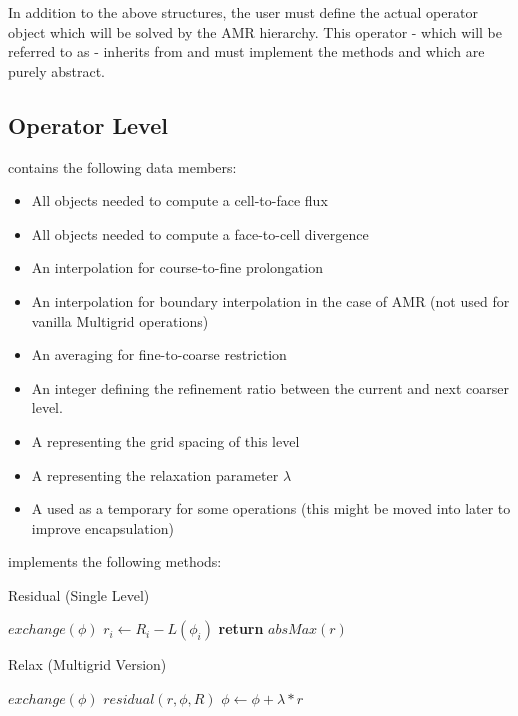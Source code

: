 \documentclass[12pt,a4paper]{article}
\begin{document}
In addition to the above structures, the user must define the actual operator object which will be solved by the AMR hierarchy. This operator - which will be referred to as  - inherits from  and must implement the methods  and  which are purely abstract. 

\subsection{Operator Level}
 contains the following data members:
\begin{itemize}
\item All  objects needed to compute a cell-to-face flux
\item All  objects needed to compute a face-to-cell divergence
\item An interpolation  for course-to-fine prolongation
\item An interpolation  for boundary interpolation in the case of AMR (not used for vanilla Multigrid operations)
\item An averaging  for fine-to-coarse restriction
\item An integer defining the refinement ratio between the current and next coarser level. 
\item A  representing the grid spacing of this level
\item A  representing the relaxation parameter $\lambda$
\item A  used as a temporary for some operations (this might be moved into  later to improve encapsulation)
\end{itemize}

 implements the following methods:

\begin{algorithm}
\caption{Residual (Single Level)}
\begin{algorithmic}[1]
\State $exchange(\phi)$
	\State $r_i \gets R_i - L(\phi_i)$ 
\EndFor
\State \textbf{return} $absMax(r)$
\EndProcedure
\end{algorithmic}
\end{algorithm}


\begin{algorithm}
\caption{Relax (Multigrid Version)}
\begin{algorithmic}[1]
	\State $exchange(\phi)$
	\State $residual(r, \phi, R)$
	\State $\phi \gets \phi + \lambda * r$
\EndFor
\EndProcedure
\end{algorithmic}
\end{algorithm}
\end{document}
